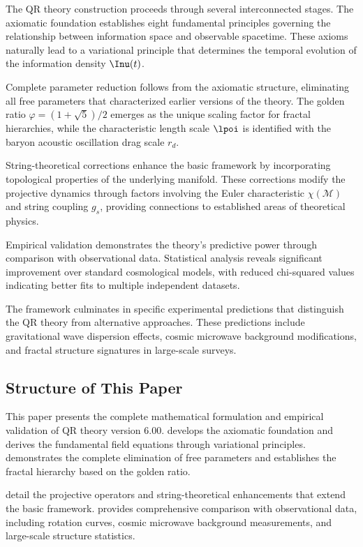 The QR theory construction proceeds through several interconnected stages. The axiomatic foundation establishes eight fundamental principles governing the relationship between information space and observable spacetime. These axioms naturally lead to a variational principle that determines the temporal evolution of the information density $\Inu(t)$.

Complete parameter reduction follows from the axiomatic structure, eliminating all free parameters that characterized earlier versions of the theory. The golden ratio $\varphi = (1+\sqrt{5})/2$ emerges as the unique scaling factor for fractal hierarchies, while the characteristic length scale $\lpoi$ is identified with the baryon acoustic oscillation drag scale $r_d$.

String-theoretical corrections enhance the basic framework by incorporating topological properties of the underlying manifold. These corrections modify the projective dynamics through factors involving the Euler characteristic $\chi(\mathcal{M})$ and string coupling $g_s$, providing connections to established areas of theoretical physics.

Empirical validation demonstrates the theory's predictive power through comparison with observational data. Statistical analysis reveals significant improvement over standard cosmological models, with reduced chi-squared values indicating better fits to multiple independent datasets.

The framework culminates in specific experimental predictions that distinguish the QR theory from alternative approaches. These predictions include gravitational wave dispersion effects, cosmic microwave background modifications, and fractal structure signatures in large-scale surveys.

\subsection{Structure of This Paper}
\label{subsec:paper-structure}

This paper presents the complete mathematical formulation and empirical validation of QR theory version 6.00.  develops the axiomatic foundation and derives the fundamental field equations through variational principles.  demonstrates the complete elimination of free parameters and establishes the fractal hierarchy based on the golden ratio.

 detail the projective operators and string-theoretical enhancements that extend the basic framework.  provides comprehensive comparison with observational data, including rotation curves, cosmic microwave background measurements, and large-scale structure statistics.


